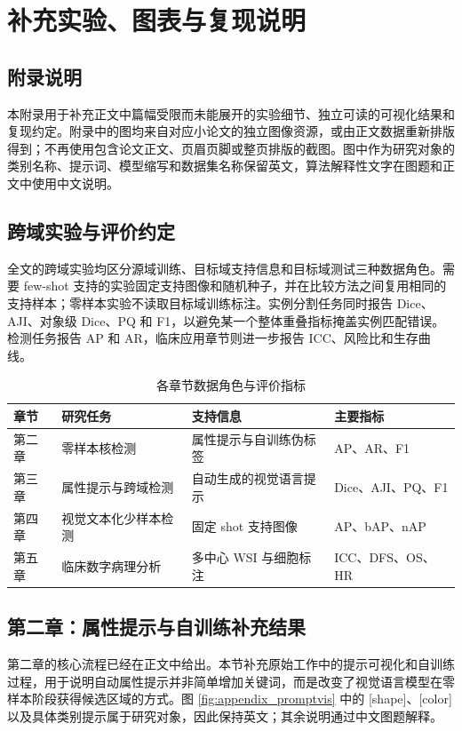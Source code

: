 \chapter{补充实验、图表与复现说明}

\section{附录说明}
本附录用于补充正文中篇幅受限而未能展开的实验细节、独立可读的可视化结果和复现约定。附录中的图均来自对应小论文的独立图像资源，或由正文数据重新排版得到；不再使用包含论文正文、页眉页脚或整页排版的截图。图中作为研究对象的类别名称、提示词、模型缩写和数据集名称保留英文，算法解释性文字在图题和正文中使用中文说明。

\section{跨域实验与评价约定}
全文的跨域实验均区分源域训练、目标域支持信息和目标域测试三种数据角色。需要 few-shot 支持的实验固定支持图像和随机种子，并在比较方法之间复用相同的支持样本；零样本实验不读取目标域训练标注。实例分割任务同时报告 Dice、AJI、对象级 Dice、PQ 和 F1，以避免某一个整体重叠指标掩盖实例匹配错误。检测任务报告 AP 和 AR，临床应用章节则进一步报告 ICC、风险比和生存曲线。

\begin{table}[htbp]
  \centering
  \caption{各章节数据角色与评价指标}
  \label{tab:appendix_protocol}
  \small
  \begin{tabular}{llll}
    \toprule
    章节 & 研究任务 & 支持信息 & 主要指标 \\
    \midrule
    第二章 & 零样本核检测 & 属性提示与自训练伪标签 & AP、AR、F1 \\
    第三章 & 属性提示与跨域检测 & 自动生成的视觉语言提示 & Dice、AJI、PQ、F1 \\
    第四章 & 视觉文本化少样本检测 & 固定 shot 支持图像 & AP、bAP、nAP \\
    第五章 & 临床数字病理分析 & 多中心 WSI 与细胞标注 & ICC、DFS、OS、HR \\
    \bottomrule
  \end{tabular}
\end{table}

\section{第二章：属性提示与自训练补充结果}
第二章的核心流程已经在正文中给出。本节补充原始工作中的提示可视化和自训练过程，用于说明自动属性提示并非简单增加关键词，而是改变了视觉语言模型在零样本阶段获得候选区域的方式。图 \ref{fig:appendix_promptvis} 中的 [shape]、[color] 以及具体类别提示属于研究对象，因此保持英文；其余说明通过中文图题解释。

